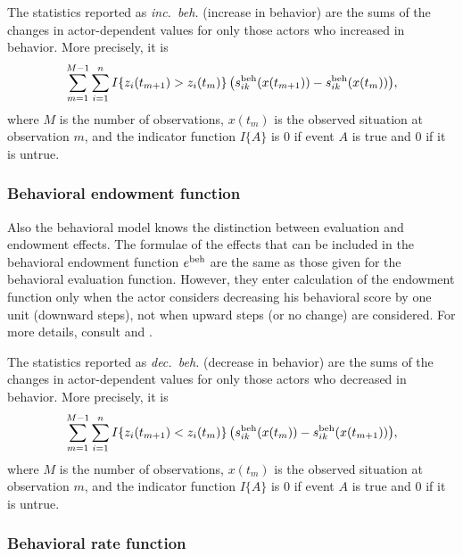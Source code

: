 \documentclass[a4paper,fleqn,11pt]{article}
\newcommand{\+}{\, + \,}
\begin{document}
The statistics reported as \emph{inc.\ beh.} (increase in behavior)
are the sums of the changes in actor-dependent values
for only those actors who increased in behavior.
More precisely, it is
\begin{equation}
\sum_{m=1}^{M-1} \sum_{i=1}^n I\{z_{i}(t_{m+1}) > z_{i}(t_m) \}\,
     \big( s^{\rm beh}_{ik}(x(t_{m+1})) -  s^{\rm beh}_{ik}(x(t_m))   \big) ,
\end{equation}
where $M$ is the number of observations, $x(t_m)$ is the observed situation
at observation $m$, and the indicator function
$I\{A\}$ is 0 if event $A$ is true
and 0 if it is untrue.

\subsubsection{Behavioral endowment function}
Also the behavioral model knows the distinction between evaluation and
endowment effects. The formulae of the effects that can be included
in the behavioral endowment function $e^{\rm beh}$ are the same as
those given for the behavioral evaluation function. However, they enter
calculation of the endowment function only when the actor considers
decreasing his behavioral score by one unit (downward steps), not
when upward steps (or no change) are considered. For more details,
consult
\citet*{SnijdersEA07} and
\citet*{SteglichEA10}.

The statistics reported as \emph{dec.\ beh.} (decrease in behavior)
are the sums of the changes in actor-dependent values
for only those actors who decreased in behavior.
More precisely, it is
\begin{equation}
\sum_{m=1}^{M-1} \sum_{i=1}^n I\{z_{i}(t_{m+1}) < z_{i}(t_m) \}\,
     \big( s^{\rm beh}_{ik}(x(t_{m})) -  s^{\rm beh}_{ik}(x(t_{m+1}))   \big) ,
\end{equation}
where $M$ is the number of observations, $x(t_m)$ is the observed situation
at observation $m$, and the indicator function
$I\{A\}$ is 0 if event $A$ is true
and 0 if it is untrue.

\subsubsection{Behavioral rate function}
\label{S_behRate}
\end{document}
